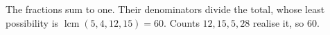 The fractions sum to one. Their denominators divide the total, whose least possibility is $\operatorname{lcm}(5,4,12,15)=60$. Counts $12,15,5,28$ realise it, so $\boxed{60}$.
